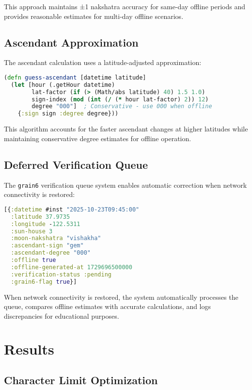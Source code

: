 \documentclass[11pt]{article}
\begin{document}
This approach maintains ±1 nakshatra accuracy for same-day offline periods and provides reasonable estimates for multi-day offline scenarios.

\subsection{Ascendant Approximation}

The ascendant calculation uses a latitude-adjusted approximation:

\begin{lstlisting}[language=Clojure, caption=Ascendant Approximation Algorithm]
(defn guess-ascendant [datetime latitude]
  (let [hour (.getHour datetime)
        lat-factor (if (> (Math/abs latitude) 40) 1.5 1.0)
        sign-index (mod (int (/ (* hour lat-factor) 2)) 12)
        degree "000"]  ; Conservative - use 000 when offline
    {:sign sign :degree degree}))
\end{lstlisting}

This algorithm accounts for the faster ascendant changes at higher latitudes while maintaining conservative degree estimates for offline operation.

\subsection{Deferred Verification Queue}

The \texttt{grain6} verification queue system enables automatic correction when network connectivity is restored:

\begin{lstlisting}[language=Clojure, caption=Verification Queue Structure]
[{:datetime #inst "2025-10-23T09:45:00"
  :latitude 37.9735
  :longitude -122.5311
  :sun-house 3
  :moon-nakshatra "vishakha"
  :ascendant-sign "gem"
  :ascendant-degree "000"
  :offline true
  :offline-generated-at 1729696500000
  :verification-status :pending
  :grain6-flag true}]
\end{lstlisting}

When network connectivity is restored, the system automatically processes the queue, compares offline estimates with accurate calculations, and logs discrepancies for educational purposes.

\section{Results}

\subsection{Character Limit Optimization}
\end{document}
